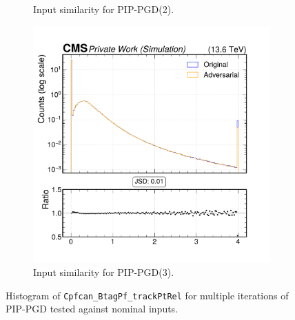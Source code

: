 \begin{figure}[htbp]
\begin{subfigure}[t]{0.32\textwidth}
    \caption*{Input similarity for PIP-PGD(2).}
  \end{subfigure}\hfill
  \begin{subfigure}[t]{0.32\textwidth}
    \includegraphics[width=\linewidth]{media/output/features/compare/combined_it_3/cmp_cpf_arr_Cpfcan_BtagPf_trackPtRel.pdf}
    \caption*{Input similarity for PIP-PGD(3).}
  \end{subfigure}

  \caption*{Histogram of \texttt{Cpfcan\_BtagPf\_trackPtRel} for multiple iterations of PIP-PGD tested against nominal inputs.}
  \label{fig:combined_input_Cpfcan_BtagPf_trackPtRel}
\end{figure}

